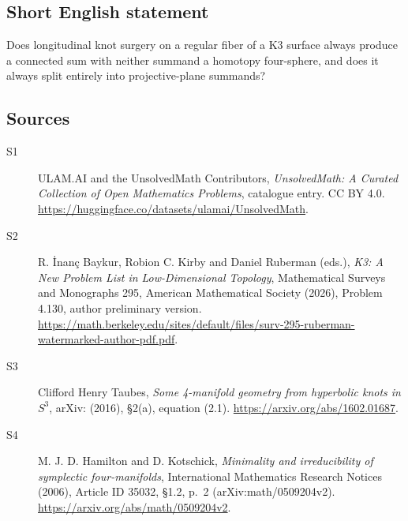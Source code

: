 \documentclass[11pt]{article}
\begin{document}
\subsection{Short English statement}
Does longitudinal knot surgery on a regular fiber of a K3 surface always produce a connected sum with neither summand a homotopy four-sphere, and does it always split entirely into projective-plane summands?
\subsection{Sources}
\begin{description}
\item[\hypertarget{source:statement:1}{S1}] ULAM.AI and the UnsolvedMath Contributors, \emph{UnsolvedMath: A Curated Collection of Open Mathematics Problems}, catalogue entry. CC BY 4.0. \url{https://huggingface.co/datasets/ulamai/UnsolvedMath}.
\item[\hypertarget{source:statement:2}{S2}] R. İnanç Baykur, Robion C. Kirby and Daniel Ruberman (eds.), \emph{K3: A New Problem List in Low-Dimensional Topology}, Mathematical Surveys and Monographs 295, American Mathematical Society (2026), Problem 4.130, author preliminary version. \url{https://math.berkeley.edu/sites/default/files/surv-295-ruberman-watermarked-author-pdf.pdf}.
\item[\hypertarget{source:statement:3}{S3}] Clifford Henry Taubes, \emph{Some 4-manifold geometry from hyperbolic knots in $S^3$}, arXiv: (2016), §2(a), equation (2.1). \url{https://arxiv.org/abs/1602.01687}.
\item[\hypertarget{source:statement:4}{S4}] M. J. D. Hamilton and D. Kotschick, \emph{Minimality and irreducibility of symplectic four-manifolds}, International Mathematics Research Notices (2006), Article ID 35032, §1.2, p.~2 (arXiv:math/0509204v2). \url{https://arxiv.org/abs/math/0509204v2}.
\end{description}
\label{end:statement}
\end{document}
